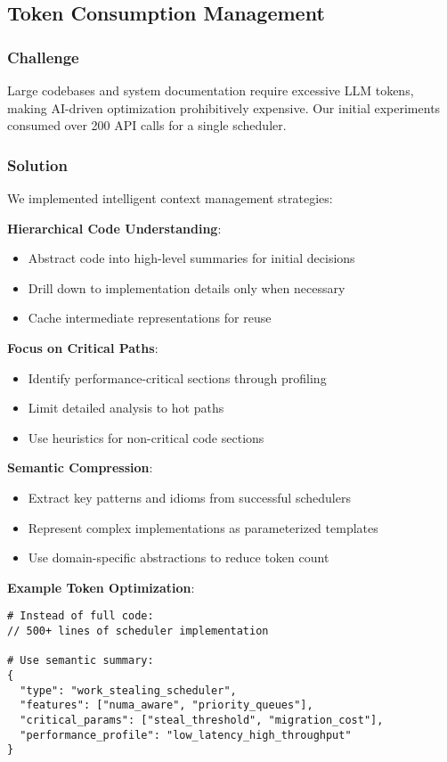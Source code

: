 \subsection{Token Consumption Management}

\subsubsection{Challenge}
Large codebases and system documentation require excessive LLM tokens, making AI-driven optimization prohibitively expensive. Our initial experiments consumed over 200 API calls for a single scheduler.

\subsubsection{Solution}
We implemented intelligent context management strategies:

\textbf{Hierarchical Code Understanding}:
\begin{itemize}
\item Abstract code into high-level summaries for initial decisions
\item Drill down to implementation details only when necessary
\item Cache intermediate representations for reuse
\end{itemize}

\textbf{Focus on Critical Paths}:
\begin{itemize}
\item Identify performance-critical sections through profiling
\item Limit detailed analysis to hot paths
\item Use heuristics for non-critical code sections
\end{itemize}

\textbf{Semantic Compression}:
\begin{itemize}
\item Extract key patterns and idioms from successful schedulers
\item Represent complex implementations as parameterized templates
\item Use domain-specific abstractions to reduce token count
\end{itemize}

\textbf{Example Token Optimization}:
\begin{verbatim}
# Instead of full code:
// 500+ lines of scheduler implementation

# Use semantic summary:
{
  "type": "work_stealing_scheduler",
  "features": ["numa_aware", "priority_queues"],
  "critical_params": ["steal_threshold", "migration_cost"],
  "performance_profile": "low_latency_high_throughput"
}
\end{verbatim}

